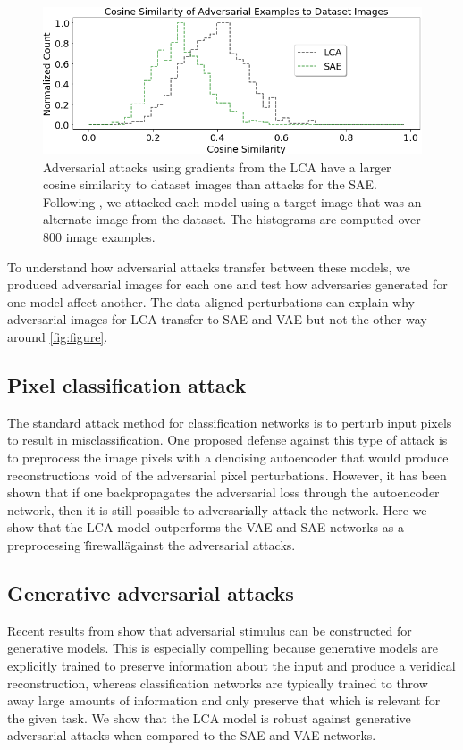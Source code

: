 \begin{figure}[h]\label{fig:cosine_similarity}
\begin{center}
\centerline{\includegraphics[width=\columnwidth]{Figures/cosyne_similarity.png}}
\end{center}
\caption{Adversarial attacks using gradients from the LCA have a larger cosine similarity to dataset images than attacks for the SAE. Following \parencite{kos2018adversarial}, we attacked each model using a target image that was an alternate image from the dataset. The histograms are computed over 800 image examples.}
\end{figure}

To understand how adversarial attacks transfer between these models, we produced adversarial images for each one and test how adversaries generated for one model affect another. The data-aligned perturbations can explain why adversarial images for LCA transfer to SAE and VAE but not the other way around \ref{fig:figure}.

\subsection{Pixel classification attack}
The standard attack method for classification networks is to perturb input pixels to result in misclassification. One proposed defense against this type of attack is to preprocess the image pixels with a denoising autoencoder that would produce reconstructions void of the adversarial pixel perturbations. However, it has been shown that if one backpropagates the adversarial loss through the autoencoder network, then it is still possible to adversarially attack the network. Here we show that the LCA model outperforms the VAE and SAE networks as a preprocessing \"firewall\" against the adversarial attacks.

\subsection{Generative adversarial attacks}
Recent results from \citet{kos2018adversarial} show that adversarial stimulus can be constructed for generative models. This is especially compelling because generative models are explicitly trained to preserve information about the input and produce a veridical reconstruction, whereas classification networks are typically trained to throw away large amounts of information and only preserve that which is relevant for the given task. We show that the LCA model is robust against generative adversarial attacks when compared to the SAE and VAE networks.

